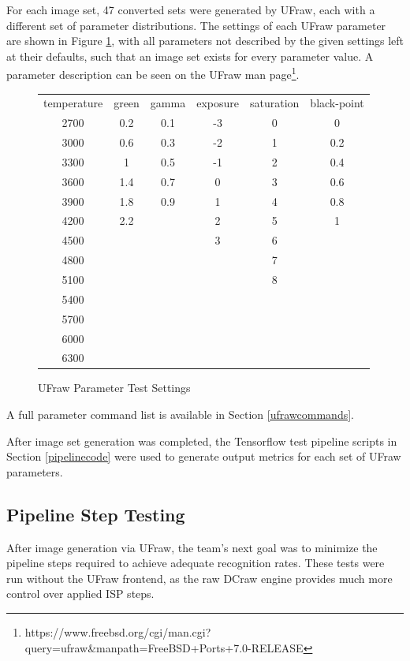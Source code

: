 \documentclass{report}
\begin{document}
		For each image set, 47 converted sets were generated by UFraw, each with a different set of parameter distributions. The settings of each UFraw parameter are shown in Figure \ref{ufraw_settings}, with all parameters not described by the given settings left at their defaults, such that an image set exists for every parameter value. A parameter description can be seen on the UFraw man page\footnote{https://www.freebsd.org/cgi/man.cgi?query=ufraw\&manpath=FreeBSD+Ports+7.0-RELEASE}.
		
		\begin{figure}
			\begin{center}
				\label{ufraw_settings}
				\caption{UFraw Parameter Test Settings}
				\begin{tabular}{cccccc}
					temperature & green & gamma & exposure & saturation & black-point \\
					2700 & 0.2 & 0.1 & -3 & 0 & 0 \\
					3000 & 0.6 & 0.3 & -2 & 1 & 0.2 \\
					3300 & 1 & 0.5 & -1 & 2 & 0.4 \\
					3600 & 1.4 & 0.7 & 0 & 3 & 0.6 \\
					3900 & 1.8 & 0.9 & 1 & 4 & 0.8 \\
					4200 & 2.2 && 2 & 5 & 1 \\
					4500 &&& 3 & 6 & \\
					4800 &&&& 7 & \\
					5100 &&&& 8 & \\
					5400 &&&&& \\
					5700 &&&&& \\
					6000 &&&&& \\
					6300 &&&&& \\
				\end{tabular}	
			\end{center}
		\end{figure}
	
		A full parameter command list is available in Section \ref{ufrawcommands}.
		
		After image set generation was completed, the Tensorflow test pipeline scripts in Section \ref{pipelinecode} were used to generate output metrics for each set of UFraw parameters.
		
		\subsection{Pipeline Step Testing}
		After image generation via UFraw, the team's next goal was to minimize the pipeline steps required to achieve adequate recognition rates. These tests were run without the UFraw frontend, as the raw DCraw engine provides much more control over applied ISP steps.
		
\end{document}
